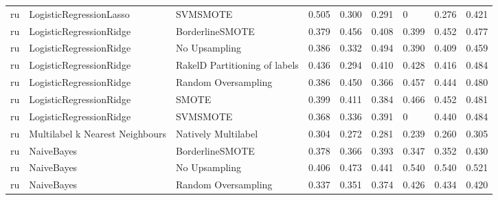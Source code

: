 \begin{tabular}{lllllllll}
      ru &         LogisticRegressionLasso &                      SVMSMOTE & 0.505 &                     0.300 &                 0.291 &                      0 &                                   0.276 &     0.421 \\
      ru &         LogisticRegressionRidge &               BorderlineSMOTE & 0.379 &                     0.456 &                 0.408 &                  0.399 &                                   0.452 &     0.477 \\
      ru &         LogisticRegressionRidge &                 No Upsampling & 0.386 &                     0.332 &                 0.494 &                  0.390 &                                   0.409 &     0.459 \\
      ru &         LogisticRegressionRidge & RakelD Partitioning of labels & 0.436 &                     0.294 &                 0.410 &                  0.428 &                                   0.416 &     0.484 \\
      ru &         LogisticRegressionRidge &           Random Oversampling & 0.386 &                     0.450 &                 0.366 &                  0.457 &                                   0.444 &     0.480 \\
      ru &         LogisticRegressionRidge &                         SMOTE & 0.399 &                     0.411 &                 0.384 &                  0.466 &                                   0.452 &     0.481 \\
      ru &         LogisticRegressionRidge &                      SVMSMOTE & 0.368 &                     0.336 &                 0.391 &                      0 &                                   0.440 &     0.484 \\
      ru & Multilabel k Nearest Neighbours &           Natively Multilabel & 0.304 &                     0.272 &                 0.281 &                  0.239 &                                   0.260 &     0.305 \\
      ru &                      NaiveBayes &               BorderlineSMOTE & 0.378 &                     0.366 &                 0.393 &                  0.347 &                                   0.352 &     0.430 \\
      ru &                      NaiveBayes &                 No Upsampling & 0.406 &                     0.473 &                 0.441 &                  0.540 &                                   0.540 &     0.521 \\
      ru &                      NaiveBayes &           Random Oversampling & 0.337 &                     0.351 &                 0.374 &                  0.426 &                                   0.434 &     0.420 \\

\end{tabular}
